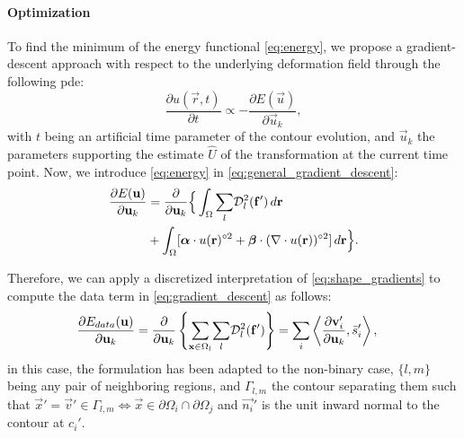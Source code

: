 \paragraph*{Optimization}
\label{sec:gradient_descent}
To find the minimum of the energy functional \eqref{eq:energy},
  we propose a gradient-descent approach with respect to the underlying
  deformation field through the following \gls*{pde}:
  \begin{equation}
  \frac{\partial u(\vec{r},t)}{\partial t} \propto - \frac{\partial E(\vec{u})}{\partial \vec{u}_k},
  \label{eq:general_gradient_descent}
  \end{equation}
  with $t$ being an artificial time parameter of the contour
  evolution, and $\vec{u}_k$ the parameters supporting the estimate
  $\hat{U}$ of the transformation at the current time point.
Now, we introduce \eqref{eq:energy} in \eqref{eq:general_gradient_descent}:
  \begin{align}
  \frac{\partial E(\vec{u})}{\partial \vec{u}_k} &=
  \frac{ \partial }{\partial \vec{u}_k} \Big\{
  \int_{\Omega} \underset{l}{\sum} \mdist{f'}{l} \,d\vec{r} \notag\\
  &+ \int_{\Omega} [ \boldsymbol{\alpha} \cdot u(\vec{r})^{\circ2}
  + \boldsymbol{\beta} \cdot (\nabla \cdot u(\vec{r}))^{\circ2} ] \,d\vec{r}
  \Big\}.
  \label{eq:gradient_descent}
  \end{align}

Therefore, we can apply a discretized interpretation of \eqref{eq:shape_gradients}
  to compute the data term in \eqref{eq:gradient_descent} as follows:
  \begin{align}
  \frac{\partial E_{data}(\vec{u})}{\partial \vec{u}_k} &=
  \frac{ \partial }{\partial \vec{u}_k} \left\{
   \underset{\vec{x} \in \Omega_l}{\sum} \underset{l}{\sum} \mdist{f'}{l} \right\}
  = \underset{i}{\sum}
   \left\langle \frac{\partial \vec{v}_i'}{\partial \vec{u}_k}, \bar{s}_i'\right\rangle,
  \label{eq:gradient_wshape}
  \end{align}
  in this case, the formulation has been adapted to the non-binary case, $\{l,m\}$
  being any pair of neighboring regions, and $\Gamma_{l,m}$ the contour separating
  them such that $\vec{x}' = \vec{v}' \in\Gamma_{l,m} \iff \vec{x}\in \partial\Omega_i \cap \partial\Omega_j$
  and $\vec{n_i}'$ is the unit inward normal to the contour at $c_i'$.

